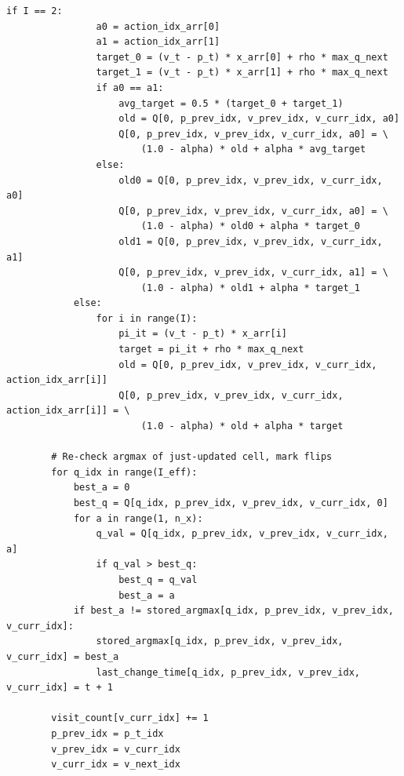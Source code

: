 \begin{lstlisting}[style=pythonstyle]
            if I == 2:
                a0 = action_idx_arr[0]
                a1 = action_idx_arr[1]
                target_0 = (v_t - p_t) * x_arr[0] + rho * max_q_next
                target_1 = (v_t - p_t) * x_arr[1] + rho * max_q_next
                if a0 == a1:
                    avg_target = 0.5 * (target_0 + target_1)
                    old = Q[0, p_prev_idx, v_prev_idx, v_curr_idx, a0]
                    Q[0, p_prev_idx, v_prev_idx, v_curr_idx, a0] = \
                        (1.0 - alpha) * old + alpha * avg_target
                else:
                    old0 = Q[0, p_prev_idx, v_prev_idx, v_curr_idx, a0]
                    Q[0, p_prev_idx, v_prev_idx, v_curr_idx, a0] = \
                        (1.0 - alpha) * old0 + alpha * target_0
                    old1 = Q[0, p_prev_idx, v_prev_idx, v_curr_idx, a1]
                    Q[0, p_prev_idx, v_prev_idx, v_curr_idx, a1] = \
                        (1.0 - alpha) * old1 + alpha * target_1
            else:
                for i in range(I):
                    pi_it = (v_t - p_t) * x_arr[i]
                    target = pi_it + rho * max_q_next
                    old = Q[0, p_prev_idx, v_prev_idx, v_curr_idx, action_idx_arr[i]]
                    Q[0, p_prev_idx, v_prev_idx, v_curr_idx, action_idx_arr[i]] = \
                        (1.0 - alpha) * old + alpha * target

        # Re-check argmax of just-updated cell, mark flips
        for q_idx in range(I_eff):
            best_a = 0
            best_q = Q[q_idx, p_prev_idx, v_prev_idx, v_curr_idx, 0]
            for a in range(1, n_x):
                q_val = Q[q_idx, p_prev_idx, v_prev_idx, v_curr_idx, a]
                if q_val > best_q:
                    best_q = q_val
                    best_a = a
            if best_a != stored_argmax[q_idx, p_prev_idx, v_prev_idx, v_curr_idx]:
                stored_argmax[q_idx, p_prev_idx, v_prev_idx, v_curr_idx] = best_a
                last_change_time[q_idx, p_prev_idx, v_prev_idx, v_curr_idx] = t + 1

        visit_count[v_curr_idx] += 1
        p_prev_idx = p_t_idx
        v_prev_idx = v_curr_idx
        v_curr_idx = v_next_idx


\end{lstlisting}
